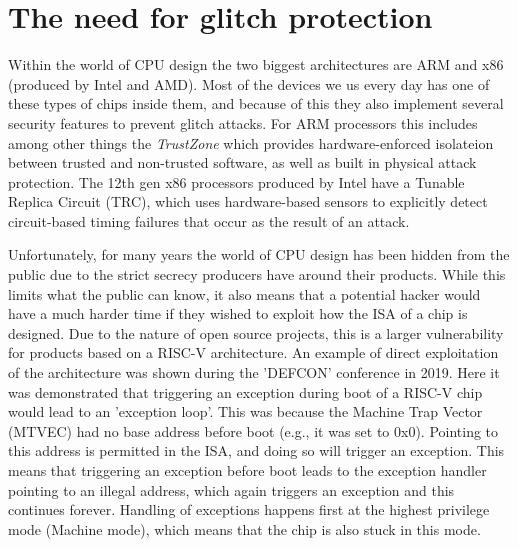 
\section{The need for glitch protection}

Within the world of CPU design the two biggest architectures are ARM and x86 (produced by Intel and AMD). Most of the devices we us every day has one of these types of chips inside them, and because of this they also implement several security features to prevent glitch attacks. For ARM processors this includes among other things the \textit{TrustZone} which provides hardware-enforced isolateion between trusted and non-trusted software, as well as built in physical attack protection\cite{arm}. The 12th gen x86 processors produced by Intel have a Tunable Replica Circuit (TRC), which uses hardware-based sensors to explicitly detect circuit-based timing failures that occur as the result of an attack\cite{intel}.  

Unfortunately, for many years the world of CPU design has been hidden from the public due to the strict secrecy producers have around their products. While this limits what the public can know, it also means that a potential hacker would have a much harder time if they wished to exploit how the ISA of a chip is designed. Due to the nature of open source projects, this is a larger vulnerability for products based on a RISC-V architecture. An example of direct exploitation of the architecture was shown during the 'DEFCON' conference in 2019\cite{isa_exploit}. Here it was demonstrated that triggering an exception during boot of a RISC-V chip would lead to an 'exception loop'. This was because the Machine Trap Vector (MTVEC) had no base address before boot (e.g., it was set to 0x0). Pointing to this address is permitted in the ISA, and doing so will trigger an exception. This means that triggering an exception before boot leads to the exception handler pointing to an illegal address, which again triggers an exception and this continues forever. Handling of exceptions happens first at the highest privilege mode (Machine mode), which means that the chip is also stuck in this mode. 

